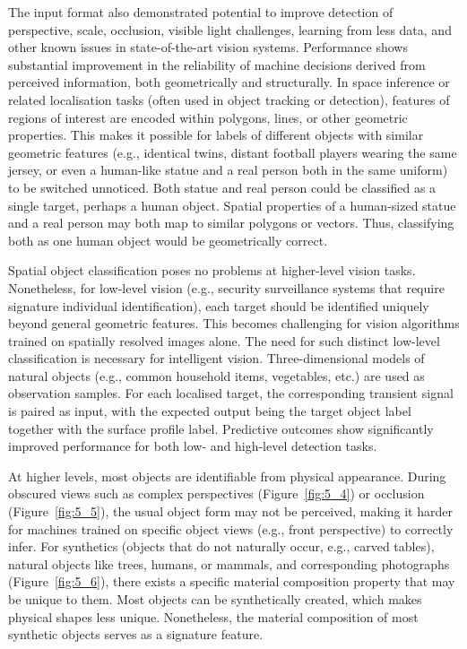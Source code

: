 \documentclass[12pt,a4paper,oneside]{report}
\begin{document}
The input format also demonstrated potential to improve detection of perspective, scale, occlusion, visible light challenges, learning from less data, and other known issues in state-of-the-art vision systems. Performance shows substantial improvement in the reliability of machine decisions derived from perceived information, both geometrically and structurally. In space inference or related localisation tasks (often used in object tracking or detection), features of regions of interest are encoded within polygons, lines, or other geometric properties. This makes it possible for labels of different objects with similar geometric features (e.g., identical twins, distant football players wearing the same jersey, or even a human-like statue and a real person both in the same uniform) to be switched unnoticed. Both statue and real person could be classified as a single target, perhaps a human object. Spatial properties of a human-sized statue and a real person may both map to similar polygons or vectors. Thus, classifying both as one human object would be geometrically correct.

Spatial object classification poses no problems at higher-level vision tasks. Nonetheless, for low-level vision (e.g., security surveillance systems that require signature individual identification), each target should be identified uniquely beyond general geometric features. This becomes challenging for vision algorithms trained on spatially resolved images alone. The need for such distinct low-level classification is necessary for intelligent vision. Three-dimensional models of natural objects (e.g., common household items, vegetables, etc.) are used as observation samples. For each localised target, the corresponding transient signal is paired as input, with the expected output being the target object label together with the surface profile label. Predictive outcomes show significantly improved performance for both low- and high-level detection tasks.

At higher levels, most objects are identifiable from physical appearance. During obscured views such as complex perspectives (Figure~\ref{fig:5_4}) or occlusion (Figure~\ref{fig:5_5}), the usual object form may not be perceived, making it harder for machines trained on specific object views (e.g., front perspective) to correctly infer. For synthetics (objects that do not naturally occur, e.g., carved tables), natural objects like trees, humans, or mammals, and corresponding photographs (Figure~\ref{fig:5_6}), there exists a specific material composition property that may be unique to them. Most objects can be synthetically created, which makes physical shapes less unique. Nonetheless, the material composition of most synthetic objects serves as a signature feature.
\end{document}
